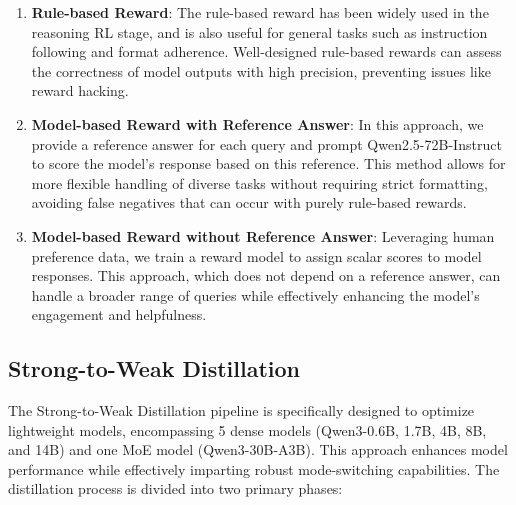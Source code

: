 \documentclass[dvipsnames]{article}
\newcommand*\justify{
  \fontdimen2\font=0.4em
  \fontdimen3\font=0.2em
  \fontdimen4\font=0.1em
  \fontdimen7\font=0.1em
  \hyphenchar\font=`\-
}
\renewcommand{\texttt}[1]{
  \begingroup
  \ttfamily
  \begingroup\lccode`~=`/\lowercase{\endgroup\def~}{/\discretionary{}{}{}}
  \begingroup\lccode`~=`[\lowercase{\endgroup\def~}{[\discretionary{}{}{}}
  \begingroup\lccode`~=`.\lowercase{\endgroup\def~}{.\discretionary{}{}{}}
  \catcode`/=\active\catcode`[=\active\catcode`.=\active
  \justify\scantokens{#1\noexpand}
  \endgroup
}
\begin{document}
\begin{enumerate}[label=(\arabic*)]
    \item \textbf{Rule-based Reward}: The rule-based reward has been widely used in the reasoning RL stage, and is also useful for general tasks such as instruction following \citep{tulu3} and format adherence. Well-designed rule-based rewards can assess the correctness of model outputs with high precision, preventing issues like reward hacking.
    \item \textbf{Model-based Reward with Reference Answer}: In this approach, we provide a reference answer for each query and prompt Qwen2.5-72B-Instruct to score the model's response based on this reference. This method allows for more flexible handling of diverse tasks without requiring strict formatting, avoiding false negatives that can occur with purely rule-based rewards.
    \item \textbf{Model-based Reward without Reference Answer}: Leveraging human preference data, we train a reward model to assign scalar scores to model responses. This approach, which does not depend on a reference answer, can handle a broader range of queries while effectively enhancing the model's engagement and helpfulness.
\end{enumerate}

\subsection{Strong-to-Weak Distillation}

The Strong-to-Weak Distillation pipeline is specifically designed to optimize lightweight models, encompassing 5 dense models (Qwen3-0.6B, 1.7B, 4B, 8B, and 14B) and one MoE model (Qwen3-30B-A3B). This approach enhances model performance while effectively imparting robust mode-switching capabilities. The distillation process is divided into two primary phases:

\end{document}
